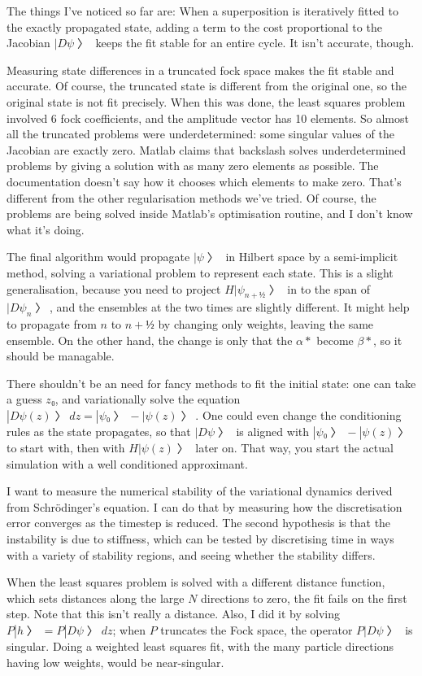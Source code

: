 The things I've noticed so far are:
When a superposition is iteratively fitted to the exactly propagated state, adding a term to the cost proportional to the Jacobian $|Dψ〉$ keeps the fit stable for an entire cycle.  It isn't accurate, though.

Measuring state differences in a truncated fock space makes the fit stable and accurate.  Of course, the truncated state is different from the original one, so the original state is not fit precisely.  When this was done, the least squares problem involved 6 fock coefficients, and the amplitude vector has 10 elements.  So almost all the truncated problems were underdetermined: some singular values of the Jacobian are exactly zero.  Matlab claims that backslash solves underdetermined problems by giving a solution with as many zero elements as possible.  The documentation doesn't say how it chooses which elements to make zero.  That's different from the other regularisation methods we've tried.  Of course, the problems are being solved inside Matlab's optimisation routine, and I don't know what it's doing.


The final algorithm would propagate $|ψ〉$ in Hilbert space by a semi-implicit method, solving a variational problem to represent each state.  This is a slight generalisation, because you need to project $H|ψ_{n+½}〉$ in to the span of $|Dψ_n〉$, and the ensembles at the two times are slightly different.  It might help to propagate from $n$ to $n+½$ by changing only weights, leaving the same ensemble.  On the other hand, the change is only that the $α*$ become $β*$, so it should be managable.

There shouldn't be an need for fancy methods to fit the initial state: one can take a guess $z₀$, and variationally solve the equation $|Dψ(z)〉dz=|ψ₀〉-|ψ(z)〉$.  One could even change the conditioning rules as the state propagates, so that $|Dψ〉$ is aligned with $|ψ₀〉-|ψ(z)〉$ to start with, then with $H|ψ(z)〉$ later on.  That way, you start the actual simulation with a well conditioned approximant.


I want to measure the numerical stability of the variational dynamics derived from Schrödinger's equation.  I can do that by measuring how the discretisation error converges as the timestep is reduced.  The second hypothesis is that the instability is due to stiffness, which can be tested by discretising time in ways with a variety of stability regions, and seeing whether the stability differs.



When the least squares problem is solved with a different distance function, which sets distances along the large $N$ directions to zero, the fit fails on the first step.  Note that this isn't really a distance.  Also, I did it by solving $P|h〉=P|Dψ〉dz$; when $P$ truncates the Fock space, the operator $P|Dψ〉$ is singular.  Doing a weighted least squares fit, with the many particle directions having low weights, would be near-singular.


\bye